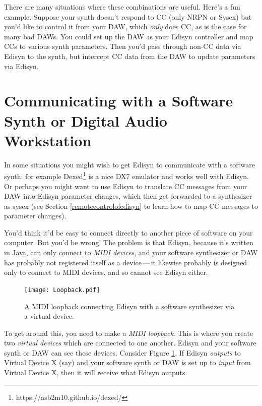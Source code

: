 \documentclass{article}
\begin{document}
There are many situations where these combinations are useful.  Here's a fun example.  Suppose your synth doesn't respond to CC (only NRPN or Sysex) but you'd like to control it from your DAW, which {\it only} does CC, as is the case for many bad DAWs.  You could set up the DAW as your Edisyn controller and map CCs to various synth parameters.  Then you'd pass through non-CC data via Edisyn to the synth, but intercept CC data from the DAW to update parameters via Edisyn.

\section{Communicating with a Software Synth or Digital Audio Workstation}
\label{loopback}

In some situations you might wish to get Edisyn to communicate with a software synth: for example Dexed\footnote{https:/\!/asb2m10.github.io/dexed/} is a nice DX7 emulator and works well with Edisyn.  Or perhaps you might want to use Edisyn to translate CC messages from your DAW into Edisyn parameter changes, which then get forwarded to a synthesizer as sysex (see Section \ref{remotecontrolofedisyn} to learn how to map CC messages to parameter changes).

You'd think it'd be easy to connect directly to another piece of software on your computer.  But you'd be wrong!  The problem is that Edisyn, because it's written in Java, can only connect to {\it MIDI devices}, and your software synthesizer or DAW has probably not registered itself as a device\,---\,it likewise probably is designed only to connect to MIDI devices, and so cannot see Edisyn either.

\begin{figure}
\begin{center}\vspace{-1em}\texttt{[image: Loopback.pdf]}\end{center}
\vspace{-2em}
\caption{A MIDI loopback connecting Edisyn with a software synthesizer via a virtual device.}\label{loopback}
\end{figure}

To get around this, you need to make a {\it MIDI loopback}.  This is where you create two {\it virtual devices} which are connected to one another.  Edisyn and your software synth or DAW can see these devices.  Consider Figure \ref{loopback}.  If Edisyn {\it outputs} to Virtual Device X (say) and your software synth or DAW is set up to {\it input} from Virtual Device X, then it will receive what Edisyn outputs.
\end{document}
